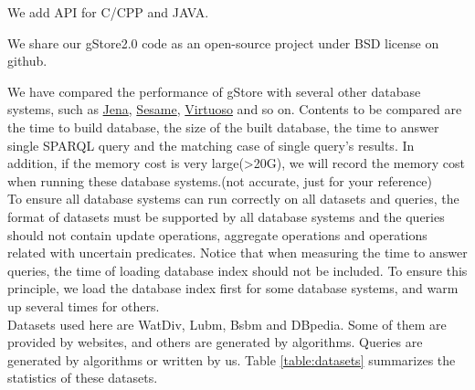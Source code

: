\documentclass[titlepage, a4paper, 12pt]{article}
\begin{document}

We add API for C/CPP and JAVA.


We share our gStore2.0 code as an open-source project under BSD license
on github.

\clearpage



We have compared the performance of gStore with several other database
systems, such as \href{http://jena.apache.org/}{Jena},
\href{http://www.rdf4j.org/}{Sesame},
\href{http://virtuoso.openlinksw.com/}{Virtuoso} and so on. Contents to
be compared are the time to build database, the size of the built
database, the time to answer single SPARQL query and the matching case
of single query's results. In addition, if the memory cost is very
large(\textgreater{}20G), we will record the memory cost when running
these database systems.(not accurate, just for your reference) \\

To ensure all database systems can run correctly on all datasets and
queries, the format of datasets must be supported by all database
systems and the queries should not contain update operations, aggregate
operations and operations related with uncertain predicates. Notice that
when measuring the time to answer queries, the time of loading database
index should not be included. To ensure this principle, we load the
database index first for some database systems, and warm up several
times for others. \\

Datasets used here are WatDiv, Lubm, Bsbm and DBpedia. Some of them are
provided by websites, and others are generated by algorithms. Queries
are generated by algorithms or written by us. Table \ref{table:datasets} summarizes the statistics of these datasets.
\end{document}
